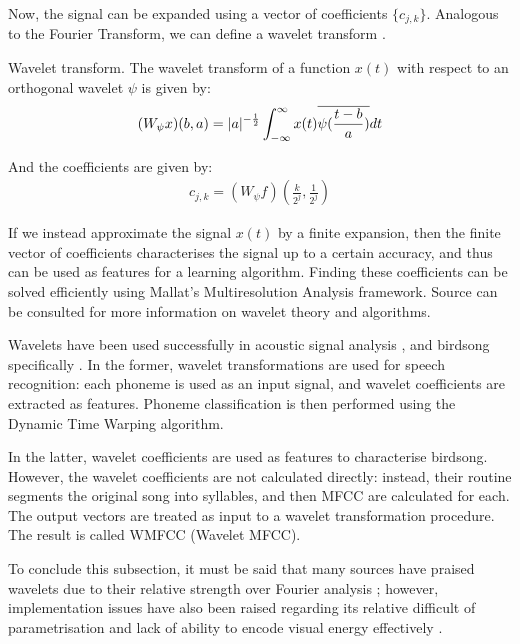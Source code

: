 \documentclass[../main.tex]{subfiles} \label{chapter_soa}
\begin{document}
\par Now, the signal can be expanded using a vector of coefficients $\{c_{j,k}\}$. Analogous to the Fourier Transform, we can define a wavelet transform \cite{Weisstein2015a}.
\begin{definition}{Wavelet transform.} \label{def_wtransform} The wavelet transform of a function $x(t)$ with respect to an orthogonal wavelet $\psi$ is given by:
\begin{align*}
(W_\psi x)(b, a) = \lvert a\rvert^{-\frac{1}{2}}\int_{-\infty}^\infty x(t)\overline{\psi(\frac{t-b}{a})}dt
\end{align*}
\end{definition}
\par And the coefficients are given by:
\begin{align*}
c_{j,k} = (W_\psi f)(\frac{k}{2^j}, \frac{1}{2^j})
\end{align*}
\par If we instead approximate the signal $x(t)$ by a finite expansion, then the finite vector of coefficients characterises the signal up to a certain accuracy, and thus can be used as features for a learning algorithm. Finding these coefficients can be solved efficiently using Mallat's Multiresolution Analysis framework. Source \cite{Vidakovic1991} can be consulted for more information on wavelet theory and algorithms.
\par Wavelets have been used successfully in acoustic signal analysis \cite{Gamulkiewicz2003}, and birdsong specifically \cite{Chou2009}. In the former, wavelet transformations are used for speech recognition: each phoneme is used as an input signal, and wavelet coefficients are extracted as features. Phoneme classification is then performed using the Dynamic Time Warping algorithm. 
\par In the latter, wavelet coefficients are used as features to characterise birdsong. However, the wavelet coefficients are not calculated directly: instead, their routine segments the original song into syllables, and then MFCC are calculated for each. The output vectors are treated as input to a wavelet transformation procedure. The result is called WMFCC (Wavelet MFCC). 
\par To conclude this subsection, it must be said that many sources have praised wavelets due to their relative strength over Fourier analysis \cite{Gamulkiewicz2003,Weisstein2015a,Chui1992,Vidakovic1991}; however, implementation issues have also been raised regarding its relative difficult of parametrisation and lack of ability to encode visual energy effectively \cite{Garrett-Glaser2010}.
\end{document}
